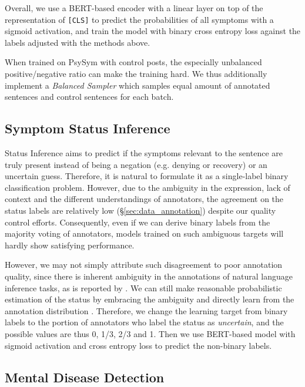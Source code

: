 Overall, we use a BERT-based encoder \citep{devlin2018bert} with a linear layer on top of the representation of \texttt{[CLS]} to predict the probabilities of all symptoms
with a sigmoid activation, and train the model with binary cross entropy loss against the labels adjusted with the methods above.

When trained on PsySym with control posts, the especially unbalanced positive/negative ratio can make the training hard. We thus additionally implement a \textit{Balanced Sampler} which samples equal amount of annotated sentences and control sentences for each batch.

\subsection{Symptom Status Inference}
\label{sec:model_status}
Status Inference aims to predict if the symptoms relevant to the sentence are truly present instead of being a negation (e.g. denying or recovery) or an uncertain guess. Therefore, it is natural to formulate it as a single-label binary classification problem. However, due to the ambiguity in the expression,
lack of context and the different understandings of annotators, the agreement on the status labels are relatively low (\S \ref{sec:data_annotation}) despite our quality control efforts. Consequently, even if we can derive binary labels from the majority voting of annotators, models trained on such ambiguous targets will hardly show satisfying performance. %

However, we may not simply attribute such disagreement to poor annotation quality, since there is inherent ambiguity in the annotations of natural language inference tasks, as is reported by \citet{nie2020can}. We can still make reasonable probabilistic estimation of the status by embracing the ambiguity and directly learn from the annotation distribution \citep{meissner2021embracing}. Therefore, we change the learning target from binary labels to the portion of annotators who label the status as \textit{uncertain}, and the possible values are thus 0, 1/3, 2/3 and 1. Then we use BERT-based model with sigmoid activation and cross entropy loss to predict the non-binary labels. 

\subsection{Mental Disease Detection}
\label{sec:disease_detect}

